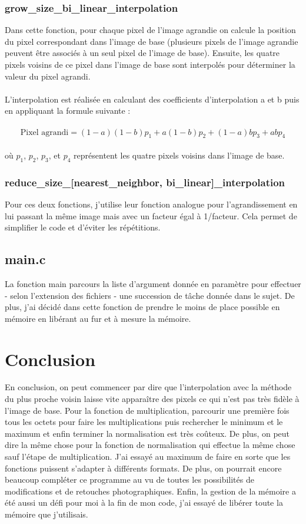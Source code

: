 \documentclass[12pt,a4paper]{article}
\begin{document}
\subsubsection{grow\_size\_bi\_linear\_interpolation}
Dans cette fonction, pour chaque pixel de l'image agrandie on calcule la position du pixel correspondant dans l'image de base (plusieurs pixels de l'image agrandie peuvent être associés à un seul pixel de l'image de base). Ensuite, les quatre pixels voisins de ce pixel dans l'image de base sont interpolés pour déterminer la valeur du pixel agrandi.\\
\\
L'interpolation est réalisée en calculant des coefficients d'interpolation a et b puis en appliquant la formule suivante :\\
\\
\[
\text{Pixel agrandi} = (1-a)(1-b)p_1 + a(1-b)p_2 + (1-a)b p_3 + ab p_4
\]
\\
où \(p_1\), \(p_2\), \(p_3\), et \(p_4\) représentent les quatre pixels voisins dans l'image de base.
\subsubsection{reduce\_size\_[nearest\_neighbor, bi\_linear]\_interpolation}
Pour ces deux fonctions, j'utilise leur fonction analogue pour l'agrandissement en lui passant la même image mais avec un facteur égal à 1/facteur. Cela permet de simplifier le code et d'éviter les répétitions.
\subsection{main.c}
La fonction main parcours la liste d'argument donnée en paramètre pour effectuer - selon l'extension des fichiers - une succession de tâche donnée dans le sujet. De plus, j'ai décidé dans cette fonction de prendre le moins de place possible en mémoire en libérant au fur et à mesure la mémoire.

\section{Conclusion}
En conclusion, on peut commencer par dire que l'interpolation avec la méthode du plus proche voisin laisse vite apparaître des pixels ce qui n'est pas très fidèle à l'image de base. Pour la fonction de multiplication, parcourir une première fois tous les octets pour faire les multiplications puis rechercher le minimum et le maximum et enfin terminer la normalisation est très coûteux. De plus, on peut dire la même chose pour la fonction de normalisation qui effectue la même chose sauf l'étape de multiplication. J'ai essayé au maximum de faire en sorte que les fonctions puissent s'adapter à différents formats. De plus, on pourrait encore beaucoup compléter ce programme au vu de toutes les possibilités de modifications et de retouches photographiques. Enfin, la gestion de la mémoire a été aussi un défi pour moi à la fin de mon code, j'ai essayé de libérer toute la mémoire que j'utilisais.
\end{document}
